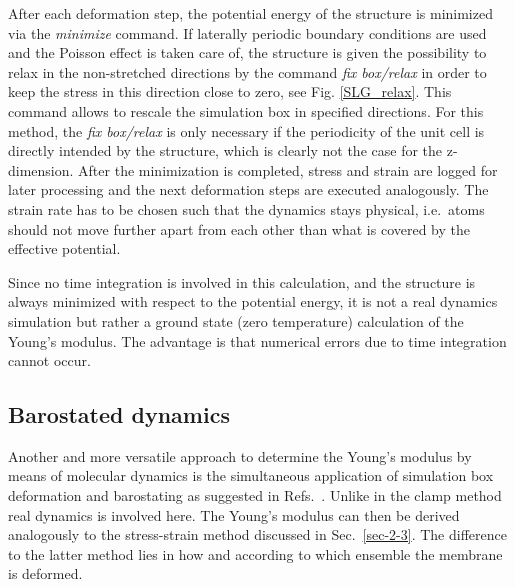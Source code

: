 \documentclass[preprint,12pt]{elsarticle}
\begin{document}
After each deformation step, the potential energy of the structure is minimized 
via the \textit{minimize} command. If laterally periodic boundary conditions are used 
and the Poisson effect is taken care of, 
the structure is given the possibility to relax in the 
non-stretched directions by the command \textit{fix box/relax} 
in order to keep the stress in this direction close to zero, see Fig. \ref{SLG_relax}. 
This command allows to rescale the simulation box in specified directions. 
For this method, the \textit{fix box/relax} is only necessary if the periodicity 
of the unit cell is directly intended by the structure, which is clearly not the 
case for the z-dimension. After the minimization is completed, stress and strain 
are logged for later processing and the next deformation steps are executed 
analogously. The strain rate has to be chosen such that the dynamics 
stays physical, i.e.\ atoms should not move further apart from each other than 
what is covered by the effective potential.

Since no time integration is involved in this calculation, and the structure 
is always minimized with respect to the potential energy, 
it is not a real dynamics simulation but rather a ground state (zero temperature) 
calculation of the Young's modulus. 
The advantage is that numerical errors due to time integration cannot occur.


\subsection{Barostated dynamics}
\label{sec-2-4}

Another and more versatile approach to determine the Young's modulus
by means of molecular dynamics is the simultaneous application of 
simulation box deformation and barostating as suggested in 
Refs.~\cite{CDB:MS17, nylon}. Unlike in the clamp method 
real dynamics is involved here. The Young's modulus 
can then be derived analogously to the stress-strain method discussed 
in Sec.~\ref{sec-2-3}. The difference to the latter method 
lies in how and according to which ensemble the membrane is deformed.
\end{document}
